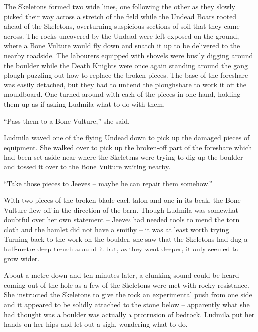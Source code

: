  

The Skeletons formed two wide lines, one following the other as they slowly picked their way across a stretch of the field while the Undead Boars rooted ahead of the Skeletons, overturning suspicious sections of soil that they came across. The rocks uncovered by the Undead were left exposed on the ground, where a Bone Vulture would fly down and snatch it up to be delivered to the nearby roadside. The labourers equipped with shovels were busily digging around the boulder while the Death Knights were once again standing around the gang plough puzzling out how to replace the broken pieces. The base of the foreshare was easily detached, but they had to unbend the ploughshare to work it off the mouldboard. One turned around with each of the pieces in one hand, holding them up as if asking Ludmila what to do with them.

 

“Pass them to a Bone Vulture,” she said.

 

Ludmila waved one of the flying Undead down to pick up the damaged pieces of equipment. She walked over to pick up the broken-off part of the foreshare which had been set aside near where the Skeletons were trying to dig up the boulder and tossed it over to the Bone Vulture waiting nearby.

 

“Take those pieces to Jeeves – maybe he can repair them somehow.”

 

With two pieces of the broken blade each talon and one in its beak, the Bone Vulture flew off in the direction of the barn. Though Ludmila was somewhat doubtful over her own statement – Jeeves had needed tools to mend the torn cloth and the hamlet did not have a smithy – it was at least worth trying. Turning back to the work on the boulder, she saw that the Skeletons had dug a half-metre deep trench around it but, as they went deeper, it only seemed to grow wider.

 

About a metre down and ten minutes later, a clunking sound could be heard coming out of the hole as a few of the Skeletons were met with rocky resistance. She instructed the Skeletons to give the rock an experimental push from one side and it appeared to be solidly attached to the stone below – apparently what she had thought was a boulder was actually a protrusion of bedrock. Ludmila put her hands on her hips and let out a sigh, wondering what to do.

